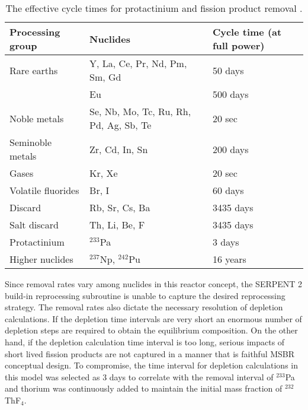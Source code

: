 \begin{table}[ht!]
        \centering
        \caption{The effective cycle times for protactinium and fission product removal \cite{robertson_conceptual_1971}.}
        \begin{tabular}{|m{} | m{}|m{}|}
        \hline 
        Processing group & \qquad\qquad\qquad Nuclides & Cycle time (at full power) \\ [5pt] \hline 
        Rare earths & Y, La, Ce, Pr, Nd, Pm, Sm, Gd & 50 days \\ [5pt] \hline 
        \qquad & Eu & 500 days \\ [5pt] \hline
        Noble metals & Se, Nb, Mo, Tc, Ru, Rh, Pd, Ag, Sb, Te & 20 sec \\ [5pt] \hline
        Seminoble metals & Zr, Cd, In, Sn & 200 days \\ [5pt] \hline
        Gases & Kr, Xe & 20 sec \\ [5pt] \hline
        Volatile fluorides & Br, I & 60 days \\ [5pt] \hline
        Discard & Rb, Sr, Cs, Ba & 3435 days \\ [5pt] \hline
        Salt discard & Th, Li, Be, F & 3435 days \\ [5pt] \hline
        Protactinium & $^{233}$Pa & 3 days \\ [5pt] \hline
        Higher nuclides & $^{237}$Np, $^{242}$Pu & 16 years \\ [5pt] \hline
        \end{tabular}
        \label{tab:reprocessing_list}
          \vspace{-0.9em}
\end{table}
Since removal rates vary among nuclides in this reactor concept, the SERPENT 2 build-in reprocessing subroutine is unable to capture the desired reprocessing strategy. The removal rates also dictate the necessary resolution of depletion 
calculations. If the depletion time intervals are very short an enormous number of depletion steps are required to obtain the equilibrium composition. On the other hand, if the depletion  calculation time interval is too long, serious impacts of short lived fission products are not captured in a manner that is faithful \gls{MSBR} conceptual design. To compromise, the time interval for depletion calculations in this model was selected as 3 days to correlate with the removal interval of $^{233}$Pa and thorium was continuously added to maintain the initial mass fraction of $^{232}$ThF$_4$.


